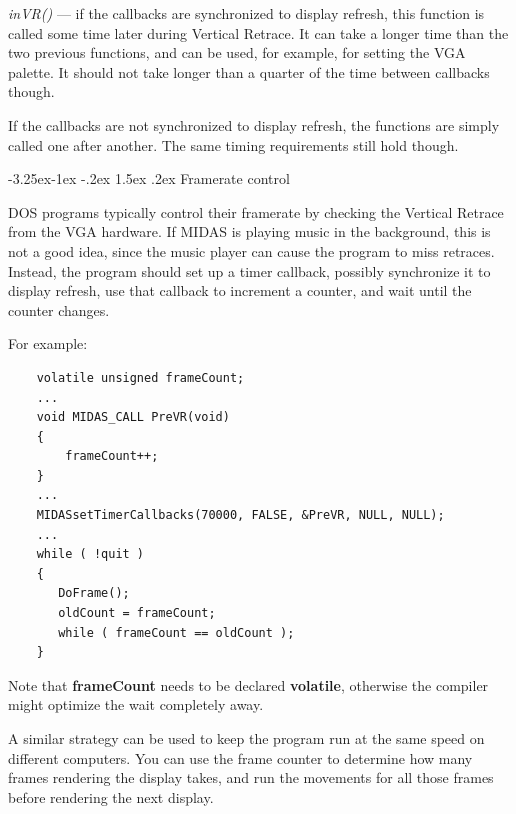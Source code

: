 \documentclass[a4paper,12pt,oneside]{book}
\makeatletter
\renewcommand\subsection{\@startsection{subsection}{2}{-20pt}%
                                     {-3.25ex\@plus -1ex \@minus -.2ex}%
                                     {1.5ex \@plus .2ex}%
                                     {\normalfont\large\bfseries}}
\newcommand{\mVariable}[1]{{\bf #1}}
\makeatother
\begin{document}
{\em inVR()} --- if the callbacks are synchronized to display refresh,
this function is called some time later during Vertical Retrace. It can
take a longer time than the two previous functions, and can be used, for
example, for setting the VGA palette. It should not take longer than a
quarter of the time between callbacks though.

If the callbacks are not synchronized to display refresh, the functions
are simply called one after another. The same timing requirements still
hold though.


\subsection{Framerate control}

DOS programs typically control their framerate by checking the Vertical
Retrace from the VGA hardware. If MIDAS is playing music in the
background, this is not a good idea, since the music player can cause
the program to miss retraces. Instead, the program should set up a timer
callback, possibly synchronize it to display refresh, use that callback
to increment a counter, and wait until the counter changes.

For example:

\begin{verbatim}
    volatile unsigned frameCount;
    ...
    void MIDAS_CALL PreVR(void)
    {
        frameCount++;
    }
    ...
    MIDASsetTimerCallbacks(70000, FALSE, &PreVR, NULL, NULL);
    ...
    while ( !quit )
    {
       DoFrame();
       oldCount = frameCount;
       while ( frameCount == oldCount );
    }
\end{verbatim}

Note that \mVariable{frameCount} needs to be declared {\bf volatile},
otherwise the compiler might optimize the wait completely away.

A similar strategy can be used to keep the program run at the same speed
on different computers. You can use the frame counter to determine how
many frames rendering the display takes, and run the movements for all
those frames before rendering the next display.
\end{document}
